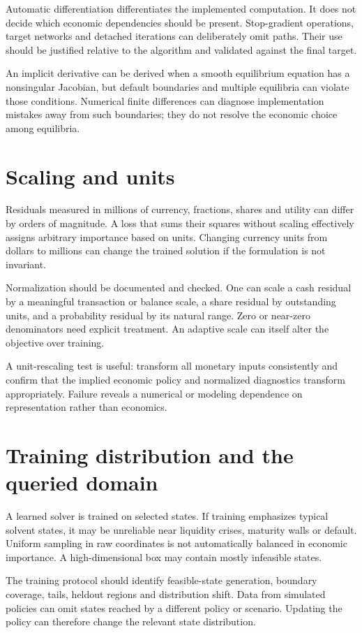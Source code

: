Automatic differentiation differentiates the implemented computation. It does not decide which economic dependencies should be present. Stop-gradient operations, target networks and detached iterations can deliberately omit paths. Their use should be justified relative to the algorithm and validated against the final target.

An implicit derivative can be derived when a smooth equilibrium equation has a nonsingular Jacobian, but default boundaries and multiple equilibria can violate those conditions. Numerical finite differences can diagnose implementation mistakes away from such boundaries; they do not resolve the economic choice among equilibria.

\section{Scaling and units}
Residuals measured in millions of currency, fractions, shares and utility can differ by orders of magnitude. A loss that sums their squares without scaling effectively assigns arbitrary importance based on units. Changing currency units from dollars to millions can change the trained solution if the formulation is not invariant.

Normalization should be documented and checked. One can scale a cash residual by a meaningful transaction or balance scale, a share residual by outstanding units, and a probability residual by its natural range. Zero or near-zero denominators need explicit treatment. An adaptive scale can itself alter the objective over training.

A unit-rescaling test is useful: transform all monetary inputs consistently and confirm that the implied economic policy and normalized diagnostics transform appropriately. Failure reveals a numerical or modeling dependence on representation rather than economics.

\section{Training distribution and the queried domain}
A learned solver is trained on selected states. If training emphasizes typical solvent states, it may be unreliable near liquidity crises, maturity walls or default. Uniform sampling in raw coordinates is not automatically balanced in economic importance. A high-dimensional box may contain mostly infeasible states.

The training protocol should identify feasible-state generation, boundary coverage, tails, heldout regions and distribution shift. Data from simulated policies can omit states reached by a different policy or scenario. Updating the policy can therefore change the relevant state distribution.

